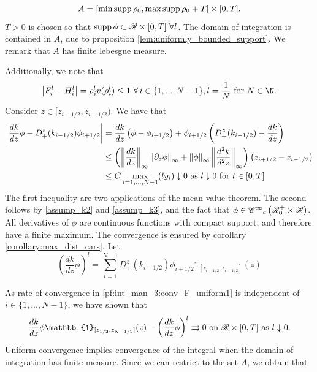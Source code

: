 \begin{equation}
	A = [\min \operatorname{supp} \rho_0, \max \operatorname{supp} \rho_0 + T] \times [0,T].
\end{equation}
$T > 0$ is chosen so that $\operatorname{supp} \phi \subset \mathscr{R} \times [0,T] \, \, \forall l $.  The domain of integration is contained in $A$, due to proposition \eqref{lem:uniformly_bounded_support}. We remark that $A$ has finite lebesgue measure. 

Additionally, we note that  
\begin{equation}
	\left|F^l_i - H^l_i\right| = \rho^l_i v(\rho^l_i) \leq 1 \, \, \forall \, i \in \{1,...,N-1\}, l = \frac{1}{N} \text{ for } N \in \N.
\end{equation}
Consider $z \in [z_{i-1/2}, z_{i+1/2})$. We have that 
\begin{align}
	\left|\frac{dk}{dz}\phi- D_+^z(k_{i-1/2}) \phi_{i+1/2} \right|&= \frac{dk}{dz}\left(\phi - \phi_{i+1/2}\right) + \phi_{i+1/2}  \left(D_+^z(k_{i-1/2}) - \frac{dk}{dz}\right) \nonumber \\
	&\leq \left(\left\lVert\frac{dk}{dz}\right\rVert_\infty \left\lVert\partial_z \phi\right\rVert_\infty + \left\lVert\phi\right\rVert_{\infty}  \left\lVert\frac{d^2k}{d^2z}\right\rVert_\infty\right) \left(z_{i+1/2} - z_{i-1/2}\right)\nonumber  \\
	&\leq C \max_{i = 1,...,N-1} (ly_i) \downarrow 0 \text{ as } l \downarrow 0 \text{ for } t \in [0,T]\label{pf:int_man_3:conv_F_uniform1}
\end{align} 
The first inequality are two applications of the mean value theorem. The second follows by \eqref{assump_k2} and \eqref{assump_k3}, and the fact that $\phi \in \mathscr{C^\infty}_c\left(\mathscr{R}_0^+ \times \mathscr{R}\right)$. All derivatives of $\phi$ are continuous functions with compact support, and therefore have a finite maximum. %
The convergence is ensured by corollary \eqref{corollary:max_dist_cars}.
Let 
\begin{equation}
	\left(\frac{dk}{dz} \phi\right)^l = \sum_{i = 1}^{N-1}D_+^z(k_{i-1/2}) \phi_{i+1/2} \mathbb{1}_{[z_{i-1/2}, z_{i+1/2}]}(z)
\end{equation}

As rate of convergence in \eqref{pf:int_man_3:conv_F_uniform1} is independent of $i \in \{1,...,N-1\}$, we have shown that 
\begin{align} \label{pf:int_man_3:conv_F_uniform2}
	\frac{dk}{dz}\phi\mathbb{1}_{[z_{1/2}, z_{N-1/2}]}(z)  - \left(\frac{dk}{dz} \phi\right)^l \rightrightarrows 0 \text{ on } \R\times[0,T] \text{ as } l \downarrow0. 
\end{align}
Uniform convergence implies convergence of the integral when the domain of integration has finite measure. Since we can restrict to the set $A$, we obtain that 

